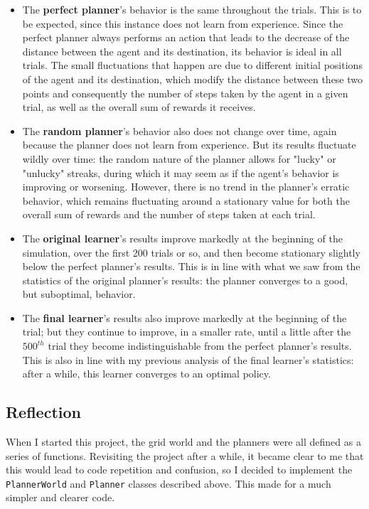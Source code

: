 \documentclass{article}
\begin{document}
\begin{itemize}
    \item The \textbf{perfect planner}'s behavior is the same throughout the trials. This is to be expected, since this instance does not learn from experience. Since the perfect planner always performs an action that leads to the decrease of the distance between the agent and its destination, its behavior is ideal in all trials. The small fluctuations that happen are due to different initial positions of the agent and its destination, which modify the distance between these two points and consequently the number of steps taken by the agent in a given trial, as well as the overall sum of rewards it receives.
    \item The \textbf{random planner}'s behavior also does not change over time, again because the planner does not learn from experience. But its results fluctuate wildly over time: the random nature of the planner allows for "lucky" or "unlucky" streaks, during which it may seem as if the agent's behavior is improving or worsening. However, there is no trend in the planner's erratic behavior, which remains fluctuating around a stationary value for both the overall sum of rewards and the number of steps taken at each trial.
    \item The \textbf{original learner}'s results improve markedly at the beginning of the simulation, over the first 200 trials or so, and then become stationary slightly below the perfect planner's results. This is in line with what we saw from the statistics of the original planner's results: the planner converges to a good, but suboptimal, behavior.
    \item The \textbf{final learner}'s results also improve markedly at the beginning of the trial; but they continue to improve, in a smaller rate, until a little after the $500^{th}$ trial they become indistinguishable from the perfect planner's results. This is also in line with my previous analysis of the final learner's statistics: after a while, this learner converges to an optimal policy. 
\end{itemize}

\subsection{Reflection}

When I started this project, the grid world and the planners were all defined as a series of functions. Revisiting the project after a while, it became clear to me that this would lead to code repetition and confusion, so I decided to implement the \texttt{PlannerWorld} and \texttt{Planner} classes described above. This made for a much simpler and clearer code.
\end{document}
